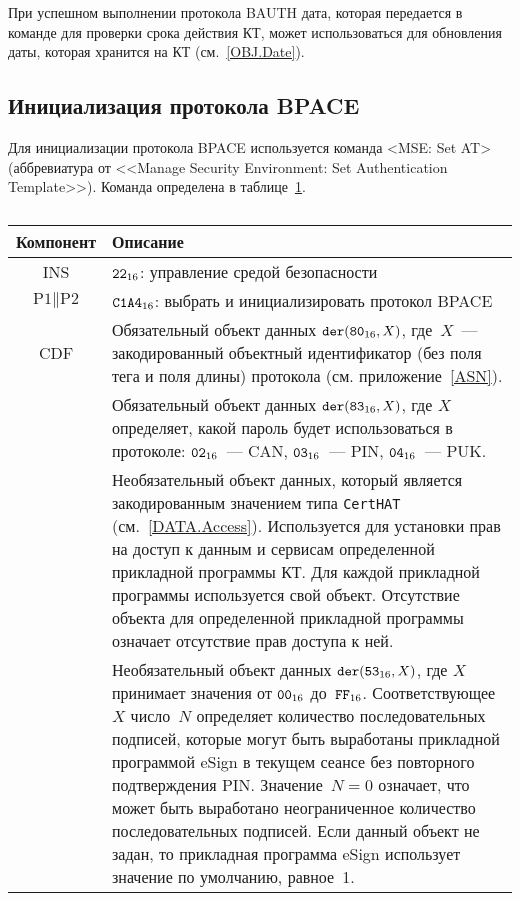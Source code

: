При успешном выполнении протокола BAUTH дата, которая передается в команде 
для проверки срока действия КТ, может использоваться для обновления 
даты, которая хранится на КТ (см.~\ref{OBJ.Date}). 

\subsection{Инициализация протокола BPACE}
\label{Oper.Descr.SetBPACE}

Для инициализации протокола BPACE используется команда
<MSE: Set AT> (аббревиатура от <<Manage Security Environment: Set 
Authentication Template>>). Команда определена в 
таблице~\ref{Table.Oper.SetBPACECmd}. 

\begin{table}[H]
\caption{}\label{Table.Oper.SetBPACECmd}
\begin{tabular}{|c|p{14cm}|}
\hline
Компонент & Описание \\
\hline
\hline
INS & $\texttt{22}_{16}$: управление средой безопасности\\ 
\hline
$\text{P1} \parallel\text{P2}$ & $\texttt{C1A4}_{16}$: выбрать и 
инициализировать протокол BPACE\\ 
\hline
CDF & Обязательный объект данных 
$\texttt{der}(\texttt{80}_{16}, X)$, где~$X$~--- 
закодированный объектный идентификатор (без поля тега и поля 
длины) протокола (см. приложение~\ref{ASN}).\\
& Обязательный объект данных $\texttt{der}(\texttt{83}_{16}, X)$, 
где $X$ определяет, какой пароль будет использоваться в протоколе: 
$\texttt{02}_{16}$~--- CAN,  $\texttt{03}_{16}$~--- PIN, 
$\texttt{04}_{16}$~--- PUK.\\
 & Необязательный объект данных, который является 
закодированным значением типа \verb|CertHAT| (см.~\ref{DATA.Access}). 
Используется для установки прав на доступ 
к данным и сервисам определенной прикладной программы КТ.
Для каждой прикладной программы используется свой объект.
Отсутствие объекта для определенной прикладной
программы означает отсутствие прав доступа к ней. \\
 & Необязательный объект данных $\texttt{der}(\texttt{53}_{16}, X)$, 
где $X$ принимает значения от $\texttt{00}_{16}$ до~$\texttt{FF}_{16}$.
Соответствующее~$X$ число~$N$ определяет количество последовательных подписей,  
которые могут быть выработаны прикладной программой eSign
в текущем сеансе без повторного подтверждения PIN.
%
Значение~$N=0$ означает, что может быть выработано 
неограниченное количество последовательных подписей. 
Если данный объект не задан, то прикладная программа eSign 
использует значение по умолчанию, равное~1.\\

\end{tabular}
\end{table}

